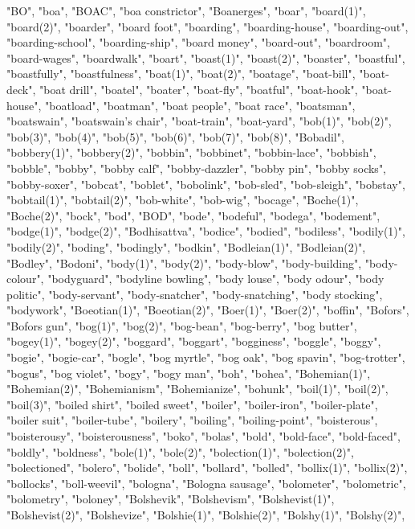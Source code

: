"BO",
"boa",
"BOAC",
"boa constrictor",
"Boanerges",
"boar",
"board(1)",
"board(2)",
"boarder",
"board foot",
"boarding",
"boarding-house",
"boarding-out",
"boarding-school",
"boarding-ship",
"board money",
"board-out",
"boardroom",
"board-wages",
"boardwalk",
"boart",
"boast(1)",
"boast(2)",
"boaster",
"boastful",
"boastfully",
"boastfulness",
"boat(1)",
"boat(2)",
"boatage",
"boat-bill",
"boat-deck",
"boat drill",
"boatel",
"boater",
"boat-fly",
"boatful",
"boat-hook",
"boat-house",
"boatload",
"boatman",
"boat people",
"boat race",
"boatsman",
"boatswain",
"boatswain's chair",
"boat-train",
"boat-yard",
"bob(1)",
"bob(2)",
"bob(3)",
"bob(4)",
"bob(5)",
"bob(6)",
"bob(7)",
"bob(8)",
"Bobadil",
"bobbery(1)",
"bobbery(2)",
"bobbin",
"bobbinet",
"bobbin-lace",
"bobbish",
"bobble",
"bobby",
"bobby calf",
"bobby-dazzler",
"bobby pin",
"bobby socks",
"bobby-soxer",
"bobcat",
"boblet",
"bobolink",
"bob-sled",
"bob-sleigh",
"bobstay",
"bobtail(1)",
"bobtail(2)",
"bob-white",
"bob-wig",
"bocage",
"Boche(1)",
"Boche(2)",
"bock",
"bod",
"BOD",
"bode",
"bodeful",
"bodega",
"bodement",
"bodge(1)",
"bodge(2)",
"Bodhisattva",
"bodice",
"bodied",
"bodiless",
"bodily(1)",
"bodily(2)",
"boding",
"bodingly",
"bodkin",
"Bodleian(1)",
"Bodleian(2)",
"Bodley",
"Bodoni",
"body(1)",
"body(2)",
"body-blow",
"body-building",
"body-colour",
"bodyguard",
"bodyline bowling",
"body louse",
"body odour",
"body politic",
"body-servant",
"body-snatcher",
"body-snatching",
"body stocking",
"bodywork",
"Boeotian(1)",
"Boeotian(2)",
"Boer(1)",
"Boer(2)",
"boffin",
"Bofors",
"Bofors gun",
"bog(1)",
"bog(2)",
"bog-bean",
"bog-berry",
"bog butter",
"bogey(1)",
"bogey(2)",
"boggard",
"boggart",
"bogginess",
"boggle",
"boggy",
"bogie",
"bogie-car",
"bogle",
"bog myrtle",
"bog oak",
"bog spavin",
"bog-trotter",
"bogus",
"bog violet",
"bogy",
"bogy man",
"boh",
"bohea",
"Bohemian(1)",
"Bohemian(2)",
"Bohemianism",
"Bohemianize",
"bohunk",
"boil(1)",
"boil(2)",
"boil(3)",
"boiled shirt",
"boiled sweet",
"boiler",
"boiler-iron",
"boiler-plate",
"boiler suit",
"boiler-tube",
"boilery",
"boiling",
"boiling-point",
"boisterous",
"boisterousy",
"boisterousness",
"boko",
"bolas",
"bold",
"bold-face",
"bold-faced",
"boldly",
"boldness",
"bole(1)",
"bole(2)",
"bolection(1)",
"bolection(2)",
"bolectioned",
"bolero",
"bolide",
"boll",
"bollard",
"bolled",
"bollix(1)",
"bollix(2)",
"bollocks",
"boll-weevil",
"bologna",
"Bologna sausage",
"bolometer",
"bolometric",
"bolometry",
"boloney",
"Bolshevik",
"Bolshevism",
"Bolshevist(1)",
"Bolshevist(2)",
"Bolshevize",
"Bolshie(1)",
"Bolshie(2)",
"Bolshy(1)",
"Bolshy(2)",
